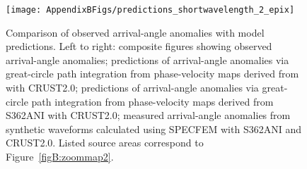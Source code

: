 \documentclass[12pt,oneside]{book}
\begin{document}
%
\begin{figure} 
\begin{center}
\texttt{[image: AppendixBFigs/predictions\_shortwavelength\_2\_epix]} 
\caption[Predictions of short-wavelength arrival-angle anomalies, continued]{Comparison of observed arrival-angle anomalies with model predictions. Left to right: composite figures showing observed arrival-angle anomalies; predictions of arrival-angle anomalies via great-circle path integration from phase-velocity maps derived from \citet{Nettles&Dziewonski2008} with CRUST2.0; predictions of arrival-angle anomalies via great-circle path integration from phase-velocity maps derived from S362ANI with CRUST2.0; measured arrival-angle anomalies from synthetic waveforms calculated using SPECFEM with S362ANI and CRUST2.0. Listed source areas correspond to Figure~\ref{figB:zoommap2}. }
\label{figB:pred_short2}
\end{center}
\end{figure}
%
\end{document}
